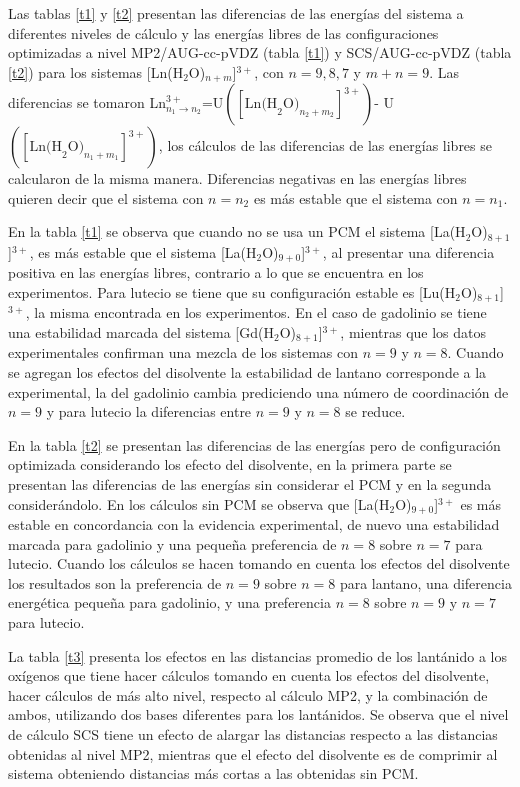 Las tablas \ref{t1} y \ref{t2} presentan las diferencias de las 
energ\'ias del sistema a diferentes niveles de c\'alculo y las 
energ\'ias libres de las configuraciones optimizadas a nivel 
MP2/AUG-cc-pVDZ (tabla \ref{t1}) y SCS/AUG-cc-pVDZ (tabla \ref{t2}) 
para los sistemas [Ln(H$_2$O)$_{n+m}$]$^{3+}$, con $n=9,8,7$ y 
$m+n=9$. Las diferencias se tomaron
Ln$^{3+}_{n_1\to n_2}$=U$\left([\mbox{Ln(H}_2\mbox{O)}_{n_2+m_2}]^{3+}\right)$-
U$\left([\mbox{Ln(H}_2\mbox{O)}_{n_1+m_1}]^{3+}\right)$, los 
c\'alculos de las diferencias de las energ\'ias libres se calcularon 
de la misma manera. Diferencias negativas en las energ\'ias libres
quieren decir que el sistema con $n=n_2$ es m\'as estable que el 
sistema con $n=n_1$.

En la tabla \ref{t1} se observa que cuando no se usa un PCM el sistema
[La(H$_2$O)$_{8+1}$]$^{3+}$, es m\'as estable que el sistema 
[La(H$_2$O)$_{9+0}$]$^{3+}$, al presentar una diferencia positiva en 
las energ\'ias libres, contrario a lo que se encuentra en los 
experimentos. Para lutecio se tiene que su configuraci\'on estable es
[Lu(H$_2$O)$_{8+1}$]$^{3+}$, la misma encontrada en los experimentos. 
En el caso de gadolinio se tiene una estabilidad marcada del sistema
[Gd(H$_2$O)$_{8+1}$]$^{3+}$, mientras que los datos experimentales 
confirman una mezcla de los sistemas con $n=9$ y $n=8$. Cuando se
agregan los efectos del disolvente la estabilidad de lantano 
corresponde a la experimental, la del gadolinio cambia prediciendo
una n\'umero de coordinaci\'on de $n=9$ y para lutecio la diferencias
entre $n=9$ y $n=8$ se reduce.
\linespread{1.0}

\linespread{1.75}

En la tabla \ref{t2} se presentan las diferencias de las energ\'ias 
pero de configuraci\'on optimizada considerando los efecto del 
disolvente, en la primera parte se presentan las diferencias de las 
energ\'ias sin considerar el PCM y en la segunda consider\'andolo. En
los c\'alculos sin PCM se observa que [La(H$_2$O)$_{9+0}$]$^{3+}$ es
m\'as estable en concordancia con la evidencia experimental, de nuevo
una estabilidad marcada para gadolinio y una peque\~na preferencia de
$n=8$ sobre $n=7$ para lutecio. Cuando los c\'alculos se hacen 
tomando en cuenta los efectos del disolvente los resultados son la
preferencia de $n=9$ sobre $n=8$ para lantano, una diferencia 
energ\'etica peque\~na para gadolinio, y una preferencia $n=8$ sobre
$n=9$ y $n=7$ para lutecio.


La tabla \ref{t3} presenta los efectos en las distancias promedio de 
los lant\'anido a los ox\'igenos que tiene hacer c\'alculos tomando
en cuenta los efectos del disolvente, hacer c\'alculos de m\'as alto
nivel, respecto al c\'alculo MP2, y la combinaci\'on de ambos, 
utilizando dos bases diferentes para los lant\'anidos. Se  observa 
que el nivel de c\'alculo SCS tiene un efecto de alargar las 
distancias respecto a las distancias obtenidas al nivel MP2, mientras 
que el efecto del disolvente es de comprimir al sistema obteniendo 
distancias m\'as cortas a las obtenidas sin PCM.


